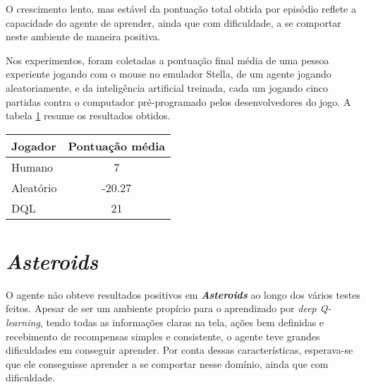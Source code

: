 
O crescimento lento, mas estável da pontuação total obtida por episódio reflete a capacidade do agente de aprender, ainda que com dificuldade, a se comportar neste ambiente de maneira positiva.

Nos experimentos, foram coletadas a pontuação final média de uma pessoa experiente jogando com o mouse no emulador Stella, de um agente jogando aleatoriamente, e da inteligência artificial treinada, cada um jogando cinco partidas contra o computador pré-programado pelos desenvolvedores do jogo.
A tabela \ref{table:pong_score} resume os resultados obtidos.

\begin{table}
\begin{center}
\begin{tabular}{l c}
\hline
Jogador & Pontuação média \\
\hline
Humano & 7 \\
Aleatório & -20.27 \\
DQL & 21 \\
\hline
\end{tabular}
\label{table:pong_score}
\end{center}
\end{table}


\section{\textit{Asteroids}}
\label{sec:res_asteroids}
O agente não obteve resultados positivos em \textbf{\textit{Asteroids}} ao longo dos vários testes feitos.
Apesar de ser um ambiente propício para o aprendizado por \textit{deep Q-learning}, tendo todas as informações claras na tela, ações bem definidas e recebimento de recompensas simples e consistente, o agente teve grandes dificuldades em conseguir aprender.
Por conta dessas características, esperava-se que ele conseguisse aprender a se comportar nesse domínio, ainda que com dificuldade.

